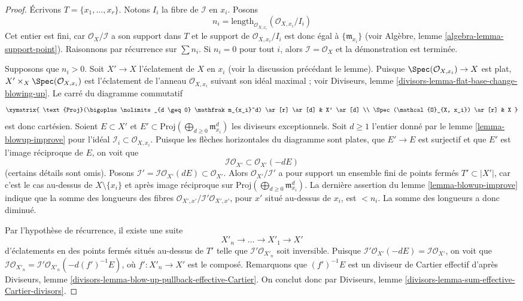 \begin{proof} Écrivons $T = \{x_1, \ldots, x_r\}$. Notons $I_i$ la fibre de $\mathcal{I}$ en $x_i$. Posons $$
n_i = \text{length}_{\mathcal{O}_{X, x_i}}(\mathcal{O}_{X, x_i}/I_i)
$$ Cet entier est fini, car $\mathcal{O}_X/\mathcal{I}$ a son support dans $T$ et le support de $\mathcal{O}_{X, x_i}/I_i$ est donc égal à $\{\mathfrak m_{x_i}\}$ (voir Algèbre, lemme \ref{algebra-lemma-support-point}). Raisonnons par récurrence sur $\sum n_i$. Si $n_i = 0$ pour tout $i$, alors $\mathcal{I} = \mathcal{O}_X$ et la démonstration est terminée.

\medskip\noindent Supposons que $n_i > 0$. Soit $X' \to X$ l'éclatement de $X$ en $x_i$ (voir la discussion précédant le lemme). Puisque $\Spec(\mathcal{O}_{X, x_i}) \to X$ est plat, $X' \times_X \Spec(\mathcal{O}_{X, x_i})$ est l'éclatement de l'anneau $\mathcal{O}_{X, x_i}$ suivant son idéal maximal ; voir Diviseurs, lemme \ref{divisors-lemma-flat-base-change-blowing-up}. Le carré du diagramme commutatif $$
\xymatrix{
\text{Proj}(\bigoplus\nolimits_{d \geq 0} \mathfrak m_{x_i}^d) \ar[r] \ar[d] &
X' \ar[d] \\
\Spec(\mathcal{O}_{X, x_i}) \ar[r] & X
}
$$ est donc cartésien. Soient $E \subset X'$ et $E' \subset \text{Proj}(\bigoplus\nolimits_{d \geq 0} \mathfrak m_{x_i}^d)$ les diviseurs exceptionnels. Soit $d \geq 1$ l'entier donné par le lemme \ref{lemma-blowup-improve} pour l'idéal $\mathcal{I}_i \subset \mathcal{O}_{X, x_i}$. Puisque les flèches horizontales du diagramme sont plates, que $E' \to E$ est surjectif et que $E'$ est l'image réciproque de $E$, on voit que $$
\mathcal{I}\mathcal{O}_{X'} \subset \mathcal{O}_{X'}(-dE)
$$ (certains détails sont omis). Posons $\mathcal{I}' = \mathcal{I}\mathcal{O}_{X'}(dE) \subset \mathcal{O}_{X'}$. Alors $\mathcal{O}_{X'}/\mathcal{I}'$ a pour support un ensemble fini de points fermés $T' \subset |X'|$, car c'est le cas au-dessus de $X \setminus \{x_i\}$ et après image réciproque sur $\text{Proj}(\bigoplus\nolimits_{d \geq 0} \mathfrak m_{x_i}^d)$. La dernière assertion du lemme \ref{lemma-blowup-improve} indique que la somme des longueurs des fibres $\mathcal{O}_{X', x'}/\mathcal{I}'\mathcal{O}_{X', x'}$, pour $x'$ situé au-dessus de $x_i$, est $< n_i$. La somme des longueurs a donc diminué.

\medskip\noindent Par l'hypothèse de récurrence, il existe une suite $$
X'_n \to \ldots \to X'_1 \to X'
$$ d'éclatements en des points fermés situés au-dessus de $T'$ telle que $\mathcal{I}'\mathcal{O}_{X'_n}$ soit inversible. Puisque $\mathcal{I}'\mathcal{O}_{X'}(-dE) = \mathcal{I}\mathcal{O}_{X'}$, on voit que $\mathcal{I}\mathcal{O}_{X'_n} =
\mathcal{I}'\mathcal{O}_{X'_n}(-d(f')^{-1}E)$, où $f' : X'_n \to X'$ est le composé. Remarquons que $(f')^{-1}E$ est un diviseur de Cartier effectif d'après Diviseurs, lemme \ref{divisors-lemma-blow-up-pullback-effective-Cartier}. On conclut donc par Diviseurs, lemme \ref{divisors-lemma-sum-effective-Cartier-divisors}. \end{proof}

